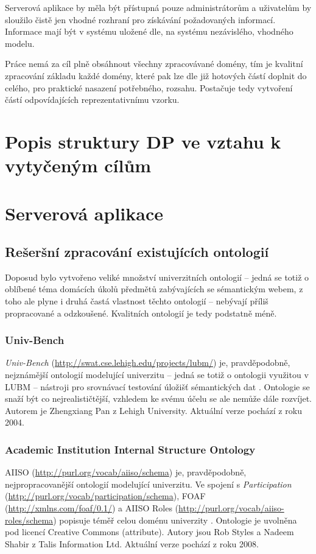 Serverová aplikace by měla být přístupná pouze administrátorům a uživatelům by sloužilo čistě jen vhodné rozhraní pro získávání požadovaných informací. Informace mají být v systému uložené dle, na systému nezávislého, vhodného modelu.

Práce nemá za cíl plně obsáhnout všechny zpracovávané domény, tím je kvalitní zpracování základu každé domény, které pak lze dle již hotových částí doplnit do celého, pro praktické nasazení potřebného, rozsahu. Postačuje tedy vytvoření částí odpovídajících reprezentativnímu vzorku.


\section{Popis struktury DP ve vztahu k vytyčeným cílům}


\section{Serverová aplikace}
\subsection{Rešeršní zpracování existujících ontologií}
Doposud bylo vytvořeno veliké množství univerzitních ontologií -- jedná se totiž o oblíbené téma domácích úkolů předmětů zabývajících se sémantickým webem, z toho ale plyne i druhá častá vlastnost těchto ontologií -- nebývají příliš propracované a odzkoušené. Kvalitních ontologií je tedy podstatně méně.

\subsubsection{Univ-Bench}
\emph{Univ-Bench} (\url{http://swat.cse.lehigh.edu/projects/lubm/}) je, pravděpodobně, nejznámější ontologií modelující univerzitu -- jedná se totiž o ontologii využitou v \gls{LUBM} -- nástroji pro srovnávací testování úložišť sémantických dat \cite{Lubm}. Ontologie se snaží být co nejrealističtější, vzhledem ke svému účelu se ale nemůže dále rozvíjet. Autorem je Zhengxiang Pan z Lehigh University. Aktuální verze pochází z roku 2004.

\subsubsection{Academic Institution Internal Structure Ontology}
\Gls{AIISO} (\url{http://purl.org/vocab/aiiso/schema}) je, pravděpodobně, nejpropracovanější ontologií modelující univerzitu. Ve spojení s \emph{Participation} (\url{http://purl.org/vocab/participation/schema}), \gls{FOAF} (\url{http://xmlns.com/foaf/0.1/}) a \gls{AIISO} Roles (\url{http://purl.org/vocab/aiiso-roles/schema}) popisuje téměř celou doménu univerzity \cite{Aiiso}. Ontologie je uvolněna pod licencí Creative Commons (attribute). Autory jsou Rob Styles a Nadeem Shabir z Talis Information Ltd. Aktuální verze pochází z roku 2008.

